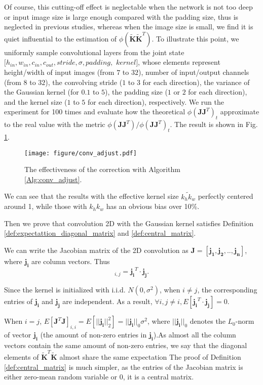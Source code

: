 \documentclass[10pt,journal,compsoc]{IEEEtran}
\begin{document}
Of course, this cutting-off effect is neglectable when the network is not too deep or input image size is large enough compared with the padding size, thus is neglected in previous studies, whereas when the image size is small, we find it is quiet influential to the estimation of $\phi\left(\widetilde{\mathbf{K}}\widetilde{\mathbf{K}}^T\right)$. To illustrate this point, we uniformly sample convolutional layers from the joint state $[h_{in}, w_{in}, c_{in}, c_{out}, stride, \sigma, padding, $ $kernel]$, whose elements represent height/width of input images (from $7$ to $32$), number of input/output channels (from $8$ to $32$), the convolving stride ($1$ to $3$ for each direction), the variance of the Gaussian kernel (for $0.1$ to $5$), the padding size ($1$ or $2$ for each direction), and the kernel size ($1$ to $5$ for each direction), respectively. We run the experiment for 100 times and evaluate how the theoretical $\phi(\mathbf{JJ}^T)_{t}$ approximate to the real value with the metric $\phi(\mathbf{JJ}^T)/\phi(\mathbf{JJ}^T)_{t}$. The result is shown in Fig. \ref{fig:verify_effective_kernel_size}.
\begin{figure}[htb!]
\centering
    \texttt{[image: figure/conv\_adjust.pdf]}
  \caption{The effectiveness of the correction with Algorithm \ref{Alg:conv_adjust}.}
  \label{fig:verify_effective_kernel_size}
\end{figure}
We can see that the results with the effective kernel size $\widetilde{k_hk_w}$ perfectly centered around 1, while those with $k_hk_w$ has an obvious bias over 10\%.

Then we prove that convolution 2D with the Gaussian kernel satisfies Definition \ref{def:expectattion_diagonal_matrix} and \ref{def:central_matrix}.

We can write the Jacobian matrix of the 2D convolution as $\mathbf{J}=[\mathbf{j_1}, \mathbf{j_2}, .., \mathbf{j_n}]$, where $\mathbf{j_i}$ are column vectors. Thus 
\begin{equation}
    [\mathbf{J}^T\mathbf{J}]_{i,j} = \mathbf{j_i}^T\cdot \mathbf{j_j}.
\end{equation}

Since the kernel is initialized with i.i.d. $N(0, \sigma^2)$, when $i \neq j$, the corresponding entries of $\mathbf{j_i}$ and $\mathbf{j_j}$ are independent. As a result, $\forall i,j\neq i, E[\mathbf{j_i}^T\cdot \mathbf{j_j}] = 0$.

When $i=j$, $E\left[\mathbf{J}^T\mathbf{J}\right]_{i,i} = E\left[||\mathbf{j_i}||_2^2\right] = ||\mathbf{j_i}||_0\sigma^2$, where $||\mathbf{j_i}||_0$ denotes the $L_0$-norm of vector $\mathbf{j_i}$ (the amount of non-zero entries in $\mathbf{j_i}$).As almost all the column vectors contain the same amount of non-zero entries, we say that the diagonal elements of $\widetilde{\mathbf{K}}^T\widetilde{\mathbf{K}}$ almost share the same expectation
The proof of Definition \ref{def:central_matrix} is much simpler, as the entries of the Jacobian matrix is either zero-mean random variable or 0, it is a central matrix.
\end{document}
